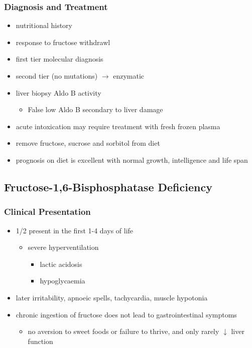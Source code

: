 \documentclass{scrartcl}
\begin{document}
\subsubsection{Diagnosis and Treatment}
\label{sec:orge6df3b9}
\begin{itemize}
\item nutritional history
\item response to fructose withdrawl
\item first tier molecular diagnosis
\item second tier (no mutations) \(\to\) enzymatic
\item liver biopsy Aldo B activity
\begin{itemize}
\item False low Aldo B secondary to liver damage
\end{itemize}

\item acute intoxication may require treatment with fresh frozen plasma

\item remove fructose, sucrose and sorbitol from diet
\item prognosis on diet is excellent with normal growth,
intelligence and life span
\end{itemize}

\subsection{Fructose-1,6-Bisphosphatase Deficiency}
\label{sec:orgeb0fe83}
\subsubsection{Clinical Presentation}
\label{sec:org6c34f4c}
\begin{itemize}
\item 1/2 present in the first 1-4 days of life
\begin{itemize}
\item severe hyperventilation
\begin{itemize}
\item lactic acidosis
\item hypoglycaemia
\end{itemize}
\end{itemize}
\item later irritability, apnoeic spells, tachycardia, muscle hypotonia
\item chronic ingestion of fructose does not lead to gastrointestinal symptoms
\begin{itemize}
\item no aversion to sweet foods or failure to thrive, and only rarely \(\downarrow\) liver function
\end{itemize}
\end{itemize}
\end{document}
